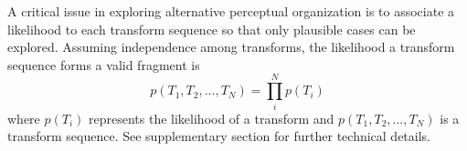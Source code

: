  



A critical issue in exploring alternative perceptual organization is to associate a likelihood to each transform sequence so that only plausible cases can be explored. Assuming independence among transforms, the likelihood a transform sequence forms a valid fragment is 
\begin{equation}
p(T_1,T_2,...,T_N)=\prod_i^Np(T_i)
\label{eq:path_like}
\end{equation}
where $p(T_i)$ represents the likelihood of a transform and $p(T_1,T_2,...,T_N)$ is a transform sequence. See supplementary section for further technical details. %


